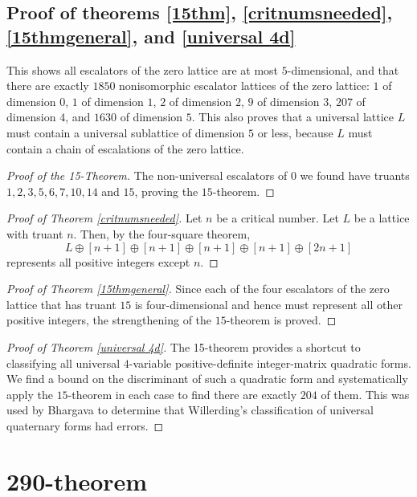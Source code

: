 \documentclass{article}
\begin{document}
\subsection{Proof of theorems \ref{15thm}, \ref{critnumsneeded}, \ref{15thmgeneral}, and \ref{universal 4d}}
This shows all escalators of the zero lattice are at most $5$-dimensional, and that there are exactly $1850$ nonisomorphic escalator lattices of the zero lattice: $1$ of dimension $0$, $1$ of dimension $1$, $2$ of dimension $2$, $9$ of dimension $3$, $207$ of dimension $4$, and $1630$ of dimension $5$. This also proves that a universal lattice $L$ must contain a universal sublattice of dimension $5$ or less, because $L$ must contain a chain of escalations of the zero lattice.

\begin{proof}[Proof of the 15-Theorem]
    The non-universal escalators of $0$ we found have truants $1, 2, 3, 5, 6, 7, 10, 14$ and $15$, proving the $15$-theorem.
\end{proof}
\begin{proof}[Proof of Theorem \ref{critnumsneeded}]
    Let $n$ be a critical number. Let $L$ be a lattice with truant $n$. Then, by the four-square theorem,
    \[L \oplus [n + 1] \oplus [n + 1] \oplus [n + 1] \oplus [n + 1] \oplus [2n + 1]\]
    represents all positive integers except $n$.
\end{proof}
\begin{proof}[Proof of Theorem \ref{15thmgeneral}]
    Since each of the four escalators of the zero lattice that has truant $15$ is four-dimensional and hence must represent all other positive integers, the strengthening of the $15$-theorem is proved.
\end{proof}

\begin{proof}[Proof of Theorem \ref{universal 4d}]
The 15-theorem provides a shortcut to classifying all universal $4$-variable positive-definite integer-matrix quadratic forms. We find a bound on the discriminant of such a quadratic form and systematically apply the $15$-theorem in each case to find there are exactly $204$ of them. This was used by Bhargava to determine that Willerding's classification of universal quaternary forms had errors.
\end{proof}

\section{290-theorem}
\end{document}
